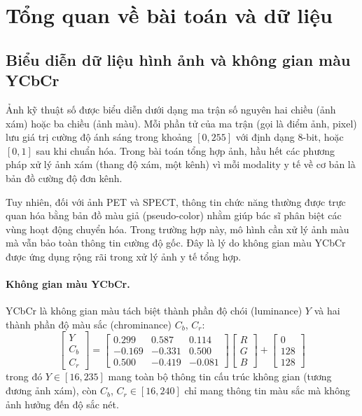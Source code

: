 
\section{Tổng quan về bài toán và dữ liệu}
\label{sec:bg-data}

\subsection{Biểu diễn dữ liệu hình ảnh và không gian màu YCbCr}
\label{ssec:ycbcr}

Ảnh kỹ thuật số được biểu diễn dưới dạng ma trận số nguyên hai chiều (ảnh xám) hoặc ba chiều (ảnh màu). Mỗi phần tử của ma trận (gọi là điểm ảnh, pixel) lưu giá trị cường độ ánh sáng trong khoảng $[0, 255]$ với định dạng 8-bit, hoặc $[0, 1]$ sau khi chuẩn hóa. Trong bài toán tổng hợp ảnh, hầu hết các phương pháp xử lý ảnh xám (thang độ xám, một kênh) vì mỗi modality y tế về cơ bản là bản đồ cường độ đơn kênh.

Tuy nhiên, đối với ảnh PET và SPECT, thông tin chức năng thường được trực quan hóa bằng bản đồ màu giả (pseudo-color) nhằm giúp bác sĩ phân biệt các vùng hoạt động chuyển hóa. Trong trường hợp này, mô hình cần xử lý ảnh màu mà vẫn bảo toàn thông tin cường độ gốc. Đây là lý do không gian màu YCbCr được ứng dụng rộng rãi trong xử lý ảnh y tế tổng hợp.

\paragraph{Không gian màu YCbCr.}
YCbCr là không gian màu tách biệt thành phần độ chói (luminance) $Y$ và hai thành phần độ màu sắc (chrominance) $C_b$, $C_r$:
\begin{equation}
\begin{bmatrix} Y \\ C_b \\ C_r \end{bmatrix}
=
\begin{bmatrix} 0.299 & 0.587 & 0.114 \\ -0.169 & -0.331 & 0.500 \\ 0.500 & -0.419 & -0.081 \end{bmatrix}
\begin{bmatrix} R \\ G \\ B \end{bmatrix}
+
\begin{bmatrix} 0 \\ 128 \\ 128 \end{bmatrix}
\label{eq:ycbcr}
\end{equation}
trong đó $Y \in [16, 235]$ mang toàn bộ thông tin cấu trúc không gian (tương đương ảnh xám), còn $C_b$, $C_r \in [16, 240]$ chỉ mang thông tin màu sắc mà không ảnh hưởng đến độ sắc nét.


